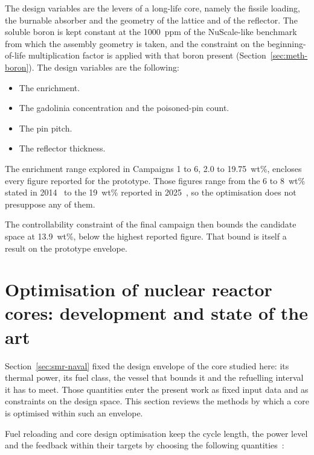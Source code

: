 The design variables are the levers of a long-life core, namely the
fissile loading, the burnable absorber and the geometry of the lattice
and of the reflector. The soluble boron is kept constant at the
1000~ppm of the NuScale-like benchmark from which the assembly geometry
is taken, and the constraint on the beginning-of-life multiplication
factor is applied with that boron present
(Section~\ref{sec:meth-boron}). The design variables are the following:

\begin{itemize}
  \item The enrichment.

  \item The gadolinia concentration and the poisoned-pin count.

  \item The pin pitch.

  \item The reflector thickness.
\end{itemize}

The enrichment range explored in Campaigns 1 to 6, 2.0 to 19.75~wt\%,
encloses every figure reported for the prototype. Those figures range
from the 6 to 8~wt\% stated in 2014~\cite{dinizcosta_2017} to the
19~wt\% reported in 2025~\cite{vasconcelos_fapesp_2025}, so the
optimisation does not presuppose any of them.

The controllability constraint of the final campaign then bounds the
candidate space at 13.9~wt\%, below the highest reported figure. That
bound is itself a result on the prototype envelope.

\section{Optimisation of nuclear reactor cores: development and state
of the art}
\label{sec:lit-opt}

Section~\ref{sec:smr-naval} fixed the design envelope of the core
studied here: its thermal power, its fuel class, the vessel that bounds
it and the refuelling interval it has to meet. Those quantities enter
the present work as fixed input data and as constraints on the design
space. This section reviews the methods by which a core is optimised
within such an envelope.

Fuel reloading and core design optimisation keep the cycle length, the
power level and the feedback within their targets by choosing the
following quantities~\cite{stewart_2021}:

